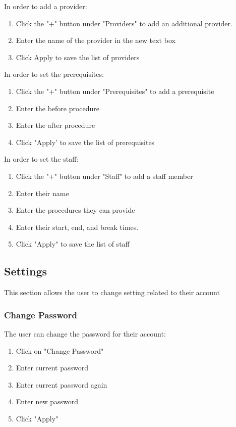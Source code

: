 \documentclass[12pt]{article}
\begin{document}
In order to add a provider:
\begin{enumerate}
\item Click the "+" button under "Providers" to add an additional provider.
\item  Enter the name of the provider in the new text box
\item Click Apply to save the list of providers
\end{enumerate}

In order to set the prerequisites:\\
\begin{enumerate}
\item Click the "+" button under "Prerequisites" to add a prerequisite
\item Enter the before procedure
\item Enter the after procedure
\item Click "Apply' to save the list of prerequisites
\end{enumerate}

In order to set the staff:
\begin{enumerate}
\item Click the "+" button under "Staff" to add a staff member
\item Enter their name
\item Enter the procedures they can provide
\item Enter their start, end, and break times.
\item Click "Apply" to save the list of staff
\end{enumerate}

\subsection{Settings}
This section allows the user to change setting related to their account

\subsubsection{Change Password}
The user can change the password for their account: \\
\begin{enumerate}
\item Click on "Change Password"
\item  Enter current password
\item Enter current password again
\item  Enter new password
\item  Click "Apply"
\end{enumerate}
\end{document}
